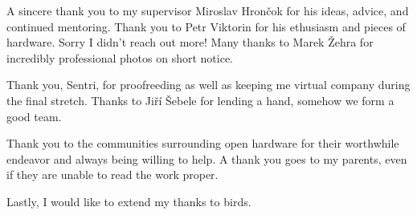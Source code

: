 A sincere thank you to my supervisor Miroslav Hrončok for his ideas, advice, and continued mentoring.  Thank you to Petr Viktorin for his ethusiasm and pieces of hardware.  Sorry I didn't reach out more!  Many thanks to Marek Žehra for incredibly professional photos on short notice.

Thank you, Sentri, for proofreeding as well as keeping me virtual company during the final stretch.  Thanks to Jiří Šebele for lending a hand, somehow we form a good team.

Thank you to the communities surrounding open hardware for their worthwhile endeavor and always being willing to help.  A thank you goes to my parents, even if they are unable to read the work proper.

Lastly, I would like to extend my thanks to birds.

